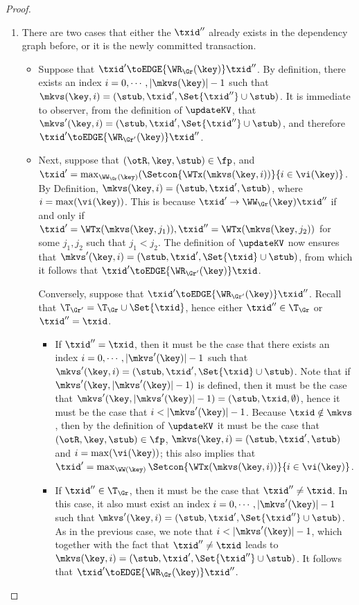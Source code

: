 \begin{proof}
\begin{enumerate}
\item There are two cases that either the \( \txid'' \) already exists in the dependency graph before,
or it is the newly committed transaction.
\begin{itemize}
\item Suppose that $\txid' \toEDGE{\WR_{\Gr}(\key)} \txid''$. 
By definition, there exists an index $i = 0,\cdots, \lvert \mkvs(\key) \rvert - 1$ 
such that $\mkvs(\key, i) = (\stub, \txid', \Set{\txid''} \cup \stub)$. It is immediate 
to observer, from the definition of $\updateKV$, that $\mkvs'(\key, i) = (\stub, \txid', \Set{\txid''} \cup \stub)$, 
and therefore $\txid' \toEDGE{\WR_{\Gr'}(\key)} \txid''$. 

\item Next, suppose that $(\otR, \key, \stub) \in \fp$, and $\txid' = \max_{\WW_{\Gr}(\key)}(\Setcon{\WTx(\mkvs(\key, i)) }{ i \in \vi(\key)}$. 
By Definition, $\mkvs(\key, i) = (\stub, \txid', \stub)$, where $i = \max(\vi(\key))$. This is because 
$\txid' \rightarrow{\WW_{\Gr}(\key)} \txid''$ if and only if $\txid' = \WTx(\mkvs(\key, j_1)), \txid'' = 
\WTx(\mkvs(\key, j_2))$ for some $j_1, j_2$ such that $j_1 < j_2$. 
The definition of $\updateKV$ now ensures that $\mkvs'(\key, i) = (\stub, \txid', \Set{\txid } \cup \stub)$, 
from which it follows that $\txid' \toEDGE{\WR_{\Gr'}(\key)} \txid$.

Conversely, suppose that $\txid' \toEDGE{\WR_{\Gr'}(\key)} \txid''$. 
Recall that $\T_{\Gr'} = \T_{\Gr} \cup \Set{ \txid }$, hence either 
$\txid'' \in \T_{\Gr}$ or $\txid'' = \txid$. 

\begin{itemize}
\item If $\txid'' = \txid$, then it must be the case that there exists an index $i = 0,\cdots, \lvert \mkvs'(\key) \rvert - 1$ 
such that $\mkvs'(\key, i) = (\stub, \txid', \Set{\txid } \cup \stub)$. Note that if $\mkvs'(\key, \lvert \mkvs'(\key) \rvert -1)$ is 
defined, then it must be the case that $\mkvs'(\key, \lvert \mkvs'(\key) \rvert -1) = (\stub, \txid, \emptyset)$, 
hence it must be the case that $i < \lvert \mkvs'(\key) \rvert - 1$. Because $\txid \notin \mkvs$, 
then by the definition of $\updateKV$ it must be the case that $(\otR, \key, \stub) \in \fp$, 
$\mkvs(\key, i) = (\stub, \txid', \stub)$ and $i = \max(\vi(\key))$; this also implies that $\txid' = 
\max_{\WW(\key)}\Setcon{\WTx(\mkvs(\key, i)) }{ i \in \vi(\key)}$. 

\item If $\txid'' \in \T_{\Gr}$, then  it must be the case that $\txid'' \neq \txid$. 
In this case, it also must exist an index $i = 0,\cdots, \lvert \mkvs'(\key) \rvert - 1$ 
such that $\mkvs'(\key, i) = (\stub, \txid', \Set{\txid''} \cup \stub)$. As in the previous 
case, we note that $i < \lvert \mkvs'(\key) \rvert - 1$, which together 
with the fact that $\txid'' \neq \txid$ leads to $\mkvs(\key, i) = (\stub, \txid', \Set{\txid''} \cup \stub)$. 
It follows that $\txid' \toEDGE{\WR_{\Gr}(\key)} \txid''$.
\end{itemize}
\end{itemize}


\end{enumerate}
\end{proof}
